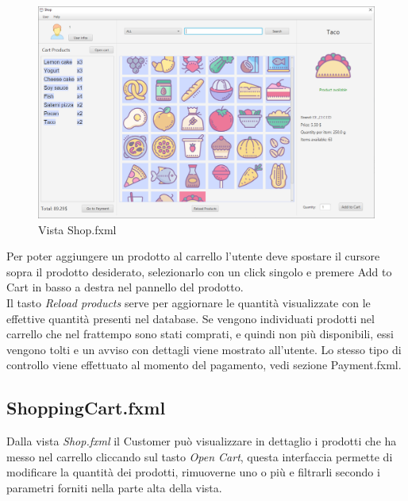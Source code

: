 \documentclass[12pt]{article}
\begin{document}
\begin{figure}[h!]
	\begin{center}
 	 	\includegraphics[width=\textwidth, height=\textheight, keepaspectratio]{media/views/shop.png}
  	 	 \caption{Vista Shop.fxml}
	\end{center}
\end{figure}


Per poter aggiungere un prodotto al carrello l'utente deve spostare il cursore sopra il prodotto desiderato, selezionarlo con un click singolo e premere Add to Cart in basso a destra nel pannello del prodotto.
\\
Il tasto \emph{Reload products} serve per aggiornare le quantità visualizzate con le effettive quantità presenti nel database. Se vengono individuati prodotti nel carrello che nel frattempo sono stati comprati, e quindi non più disponibili, essi vengono tolti e un avviso con dettagli viene mostrato all'utente. Lo stesso tipo di controllo viene effettuato al momento del pagamento, vedi sezione Payment.fxml.


\clearpage



\subsection{ShoppingCart.fxml}
Dalla vista \emph{Shop.fxml} il Customer può visualizzare in dettaglio i prodotti che ha messo nel carrello cliccando sul tasto \emph{Open Cart}, questa interfaccia permette di modificare la quantità dei prodotti, rimuoverne uno o più e filtrarli secondo i parametri forniti nella parte alta della vista.
\end{document}
